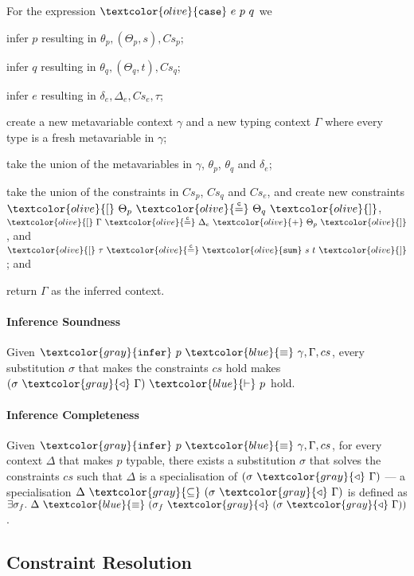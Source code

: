 \documentclass[sigplan,screen,review]{acmart}
\newcommand{\constr}[1]{\textcolor{olive}{\mathtt{#1}}}
\newcommand{\func}[1]{\textcolor{gray}{\mathtt{#1}}}
\newcommand{\type}[1]{\textcolor{blue}{\mathtt{#1}}}
\newcommand{\tEq}[2]{#1~\type{\equiv}~#2}
\newcommand{\tProc}[2]{#1 ~ \type{\vdash} ~ #2}
\newcommand{\scase}{\constr{case}}
\newcommand{\tsum}{\constr{sum}}
\newcommand{\subst}[2]{#1 ~ \func{\triangleleft} ~ #2}
\newcommand{\eqconstr}[2]{\constr{[} ~ #1 ~ \constr{\stackrel{c}{=}} ~ #2 ~ \constr{]}}
\newcommand{\sumconstr}[3]{\constr{[} ~ #1 ~ \constr{\stackrel{c}{=}} ~ #2 ~ \constr{+} ~ #3 ~ \constr{]}}
\begin{document}
For the expression $\scase~e~p~q$ we
  \begin{enumerate*}[label=\textcolor{gray}{\arabic*)}]
  \item infer $p$ resulting in $\theta_p, (\Theta_p, s) , Cs_p$;
  \item infer $q$ resulting in $\theta_q, (\Theta_q, t) , Cs_q$;
  \item infer $e$ resulting in $\delta_e, \Delta_e, Cs_e, \tau$;
  \item create a new metavariable context $\gamma$ and a new typing context $\Gamma$ where every type is a fresh metavariable in $\gamma$;
  \item take the union of the metavariables in $\gamma$, $\theta_p$, $\theta_q$ and $\delta_e$;
  \item take the union of the constraints in $Cs_p$, $Cs_q$ and $Cs_e$, and create new constraints $\eqconstr{\Theta_p}{\Theta_q}$, $\sumconstr{\Gamma}{\Delta_e}{\Theta_p}$, and $\eqconstr{\tau}{\tsum~s~t}$; and
  \item return $\Gamma$ as the inferred context.
\end{enumerate*}

\paragraph{Inference Soundness}

Given $\tEq{\func{infer}~p}{\gamma , \Gamma , cs}$, every substitution \(\sigma\) that makes the constraints $cs$ hold makes $\tProc{(\subst{\sigma}{\Gamma})}{p}$ hold.

\paragraph{Inference Completeness}

Given $\tEq{\func{infer}~p}{\gamma , \Gamma , cs}$, for every context \(\Delta\) that makes $p$ typable, there exists a substitution \(\sigma\) that solves the constraints $cs$ such that $\Delta$ is a specialisation of $(\subst{\sigma}{\Gamma})$ --- a specialisation $\Delta ~ \func{\subseteq} ~ (\subst{\sigma}{\Gamma})$ is defined as $\exists \sigma_f . ~ \tEq{\Delta}{(\subst{\sigma_f}{(\subst{\sigma}{\Gamma})})}$.

\subsection{Constraint Resolution}
\label{constraint-resolution}
\end{document}
